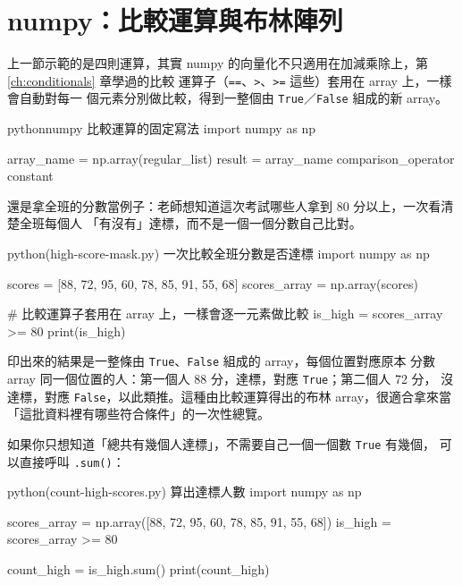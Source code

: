 \section{numpy：比較運算與布林陣列}
\label{sec:numpy-boolean}

上一節示範的是四則運算，其實 numpy 的向量化不只適用在加減乘除上，第 \ref{ch:conditionals} 章學過的比較
運算子（\texttt{==}、\texttt{>}、\texttt{>=} 這些）套用在 array 上，一樣會自動對每一
個元素分別做比較，得到一整個由 \texttt{True}／\texttt{False} 組成的新 array。

\begin{code}{python}{numpy 比較運算的固定寫法}
import numpy as np

array_name = np.array(regular_list)
result = array_name comparison_operator constant
\end{code}

還是拿全班的分數當例子：老師想知道這次考試哪些人拿到 80 分以上，一次看清楚全班每個人
「有沒有」達標，而不是一個一個分數自己比對。

\begin{example}{python}{(high-score-mask.py) 一次比較全班分數是否達標}
import numpy as np

scores = [88, 72, 95, 60, 78, 85, 91, 55, 68]
scores_array = np.array(scores)

# 比較運算子套用在 array 上，一樣會逐一元素做比較
is_high = scores_array >= 80
print(is_high)
\end{example}


印出來的結果是一整條由 \texttt{True}、\texttt{False} 組成的 array，每個位置對應原本
分數 array 同一個位置的人：第一個人 88 分，達標，對應 \texttt{True}；第二個人 72 分，
沒達標，對應 \texttt{False}，以此類推。這種由比較運算得出的布林 array，很適合拿來當
「這批資料裡有哪些符合條件」的一次性總覽。

如果你只想知道「總共有幾個人達標」，不需要自己一個一個數 \texttt{True} 有幾個，
可以直接呼叫 \texttt{.sum()}：

\begin{example}{python}{(count-high-scores.py) 算出達標人數}
import numpy as np

scores_array = np.array([88, 72, 95, 60, 78, 85, 91, 55, 68])
is_high = scores_array >= 80

count_high = is_high.sum()
print(count_high)
\end{example}

